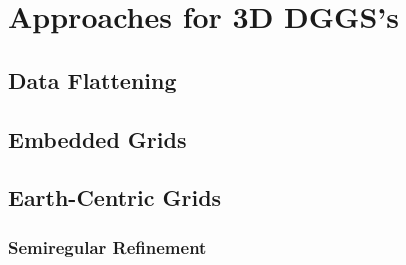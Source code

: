 \chapter{Approaches for 3D DGGS's} \label{chap:3ddggs}

\section{Data Flattening}

\section{Embedded Grids}

\section{Earth-Centric Grids}

\subsection{Semiregular Refinement}